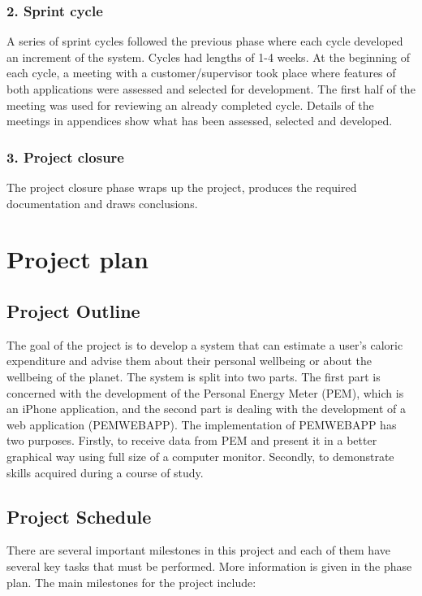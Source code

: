 \documentclass[12pt, a4paper]{report}   %
\begin{document}
\subsubsection{2. Sprint cycle}
A series of sprint cycles followed the previous phase where each cycle developed an increment of the system. Cycles had lengths of 1-4 weeks. At the beginning of each cycle, a meeting with a customer/supervisor took place where features of both applications were assessed and selected for development. The first half of the meeting was used for reviewing an already completed cycle. Details of the meetings in appendices show what has been assessed, selected and developed.


\subsubsection{3. Project closure}
The project closure phase wraps up the project, produces the required documentation and draws conclusions.


\clearpage
\section{Project plan}
\subsection{Project Outline}
The goal of the project is to develop a system that can estimate a user's caloric expenditure and advise them about their personal wellbeing or about the wellbeing of the planet.
The system is split into two parts. The first part is concerned with the development of the Personal Energy Meter (PEM), which is an iPhone application, and the second part is dealing with the development of a web application (PEMWEBAPP). The implementation of PEMWEBAPP has two purposes. Firstly, to receive data from PEM and present it in a better graphical way using full size of a computer monitor. Secondly, to demonstrate skills acquired during a course of study.


\subsection{Project Schedule}
There are several important milestones in this project and each of them have several key tasks that must be performed. More information is given in the phase plan.
The main milestones for the project include:
\end{document}
